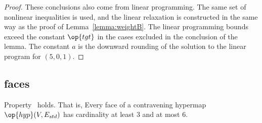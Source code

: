 \begin{proof} These conclusions also come from linear programming.
  The same set of nonlinear inequalities is used, and the linear
  relaxation is constructed in the same way as the proof of Lemma~\ref{lemma:weightB}.  The linear programming
  bounds exceed the constant $\op{tgt}$ in the cases excluded in the
  conclusion of the lemma.  The constant $a$ is the downward rounding
  of the solution to the linear program for $(5,0,1)$.
\end{proof}
%

%

\subsection{faces}



\begin{lemma}[]  \label{lemma:face-size}
  Property~ holds.  That is, Every face of a
  contravening hypermap $\op{hyp}(V,E_{std})$ has cardinality at least
  $3$ and at most $6$.
\end{lemma}

